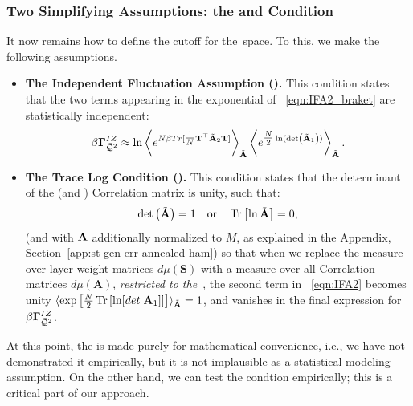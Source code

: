 \subsubsection{Two Simplifying Assumptions: the \IFA and \TRACELOG Condition}
\label{sxn:matgen_quality_hciz_C}

It now remains how to define the cutoff for the~\ECS space. To this, we make the following assumptions.
\begin{itemize}
\item
\textbf{The Independent Fluctuation Assumption (\IFA).}
This condition states that the two terms appearing in the exponential of \EQN~\ref{eqn:IFA2_braket} are statistically independent:
\begin{align}
  \label{eqn:IFA2}
  \beta\mathbf{\Gamma}^{IZ}_{\bar{\mathcal{Q}}^{2}} \approx \ln
  \left\langle
  e^{N\beta Tr[ \tfrac{1}{N}{\mathbf{T}}^{\top}\tilde{\mathbf{A}}_{2}{\mathbf{T}}] }
  \right\rangle_{\tilde{\mathbf{A}}}
  \left\langle
  e^{\tfrac{N}{2}\ln(\mbox{}{\text{det}}\left(\tilde{\mathbf{A}}_{1}\right))}
    \right\rangle_{\tilde{\mathbf{A}}}.
\end{align}

\item
\textbf{The Trace Log Condition (\TRACELOG).}
This condition states that the determinant of the \Student (and \Teacher) Correlation matrix is unity, such that:
\begin{align}
\label{eqn:tlc_mm}
\mbox{}{\text{det}}\left(\tilde{\mathbf{A}}\right)=1 
\quad\mbox{or}\quad
\mbox{}\operatorname{Tr}\left[\ln \tilde{\mathbf{A}}\right]=0  ,
\end{align}
(and with $\mathbf{A}$ additionally normalized to $M$, as explained in the Appendix, Section~\ref{app:st-gen-err-annealed-ham})
so that when we replace the measure over \Student layer weight matrices $d\mu(\mathbf{S})$ with a measure over all \Student Correlation matrices $d\mu(\mathbf{A})$,
\emph{restricted to the~\ECS}, the second term in \EQN~\ref{eqn:IFA2} becomes unity
$\langle \exp\left[\tfrac{N}{2} \mbox{}\operatorname{Tr}\left[ \ln[det\;\mathbf{A}_{1}] \right] \right]\rangle_{\tilde{\mathbf{A}}}=1$,
and vanishes in the final expression for $\beta\mathbf{\Gamma}^{IZ}_{\bar{\mathcal{Q}}^{2}}$.
\end{itemize}

\noindent
At this point, the \IFA is made purely for mathematical convenience, i.e., 
we have not demonstrated it empirically, but it is not implausible as a statistical modeling assumption. 
On the other hand, we can test the \TRACELOG condtion empirically;
this is a critical part of our \SETOL approach.


